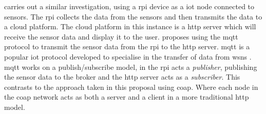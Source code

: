 \cite{rode_iot_2017} carries out a similar investigation, using a \gls{rpi} 
device as a \gls{iot} node connected to sensors. The \gls{rpi} collects the 
data from the sensors and then transmits the data to a cloud platform. The 
cloud platform in this instance is a \gls{http} server which will receive the
sensor data and display it to the user. \cite{rode_iot_2017} proposes using the 
\gls{mqtt} protocol to transmit the sensor data from the \gls{rpi} to the
 \gls{http} server.
\gls{mqtt} is a popular \gls{iot} protocol developed to specialise in the transfer
of data from \glspl{wsn} \citep{hunkeler_mqtt-s_2008}. \gls{mqtt} works on a 
publish/subscribe model, in \cite{rode_iot_2017} the \gls{rpi} acts a \textit{publisher}, 
publishing the sensor data to the broker and the \gls{http} server acts as a \textit{subscriber}.
This contrasts to the approach taken in this proposal using \gls{coap}. Where each
node in the \gls{coap} network acts as both a server and a client in a more traditional
 \gls{http} model.